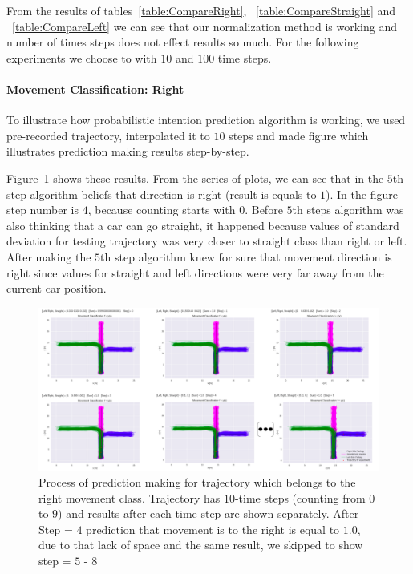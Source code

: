 From the results of tables~\ref{table:CompareRight}, ~\ref{table:CompareStraight} and ~\ref{table:CompareLeft}  we can see that our normalization method is working and number of times steps does not effect results so much. For the following experiments we choose to with $10$ and $100$ time steps.

\paragraph{Movement Classification: Right}

To illustrate how probabilistic intention prediction algorithm is working, we used pre-recorded trajectory, interpolated it to $10$ steps and made figure which illustrates prediction making results step-by-step.  

Figure~\ref{fig:rightPrediction} shows these results. From the series of plots, we can see that in the $5$th step algorithm beliefs that direction is right (result is equals to $1$). In the figure step number is $4$, because counting starts with $0$. Before $5$th steps algorithm was also thinking that a car can go straight, it happened because values of standard deviation for testing trajectory was very closer to straight class than right or left. After making the $5$th step algorithm knew for sure that movement direction is right since values for straight and left directions were very far away from the current car position. 

\begin{figure}[H]
	\centering  	
	\includegraphics[width=18cm]{img/0_prediction_right.PNG}
	\caption{Process of prediction making for trajectory which belongs to the right movement class. Trajectory has $10$-time steps (counting from $0$ to $9$) and results after each time step are shown separately. After Step = $4$  prediction that movement is to the right is equal to $1.0$, due to that lack of space and the same result, we skipped to show step = $5$ - $8$}
	\label{fig:rightPrediction}    
\end{figure}


